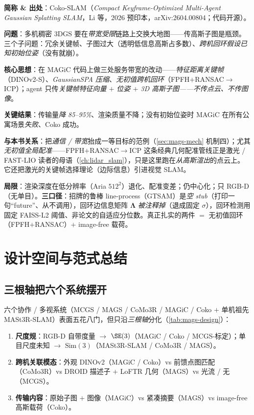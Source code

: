 \begin{paper}
\textbf{简称 \& 出处}：Coko-SLAM（\emph{Compact Keyframe-Optimized Multi-Agent Gaussian Splatting SLAM}，Li 等，2026 预印本，arXiv:2604.00804；代码开源）\cite{li2026kokoslam}。

\textbf{问题}：多机稠密 3DGS 要在\emph{带宽受限}链路上交换大地图——传高斯子图是瓶颈。三个子问题：冗余关键帧、子图过大（透明低信息高斯占多数）、\emph{跨机回环假设已知初始位姿}（没有就崩）。

\textbf{核心思想}：在 MAGiC 代码上做三处服务带宽的改动——\emph{特征距离关键帧}（DINOv2-S）、\emph{GaussianSPA 压缩}、\emph{无初值跨机回环}（FPFH$+$RANSAC$\to$ICP）；agent 只传\emph{关键帧特征向量 $+$ 位姿 $+$ 3D 高斯子图——不传点云、不传图像}。

\textbf{关键结果}：传输量\emph{降 85–95\%}、渲染质量不降；没有初始位姿时 MAGiC 在所有公寓场景\emph{失败}、Coko 成功。

\textbf{与本书关系}：把\emph{通信 / 带宽}抬成一等目标的范例（\cref{sec:mags-mech} 机制四）；尤其\emph{无初值全局配准}——FPFH$+$RANSAC$\to$ICP 这条经典几何配准管线正是激光 / FAST-LIO 读者的母语（\cref{ch:lidar_slam}），只是这里跑在\emph{从高斯渲出}的点云上。它还把激光的关键帧选择理论（边际信息）引进视觉 SLAM。

\textbf{局限}：渲染深度在低分辨率（Aria $512^2$）退化、配准变差；仍中心化；只 RGB-D（无单目）。\textbf{三口径}：招牌的鲁棒 line-process（GTSAM）是\emph{空 stub}（打印一句“future”、从不调用），回环边信息矩阵 $\boldsymbol\Lambda$ \emph{被注释掉}（退成固定 $\sigma$），回环检测用固定 FAISS-L2 阈值、非论文的自适应分位数。真正扎实的两件 $=$ 无初值回环（FPFH$+$RANSAC）$+$ image-free 载荷。
\end{paper}

\section{设计空间与范式总结}
\label{sec:mags-designspace}

\subsection{三根轴把六个系统摆开}

六个协作 / 多视系统（MCGS / MAGS / CoMo3R / MAGiC / Coko $+$ 单机祖先 MASt3R-SLAM）表面五花八门，但只沿\emph{三根轴}分化（\cref{tab:mags-design}）：
\begin{enumerate}
  \item \textbf{尺度规}：RGB-D 自带度量 $\to$ $\SE(3)$（MAGiC / Coko / MCGS-标定）；单目尺度未知 $\to$ $\mathrm{Sim}(3)$（MASt3R-SLAM / CoMo3R / MAGS）。
  \item \textbf{跨机关联模态}：外观 DINOv2（MAGiC / Coko）vs 前馈点图匹配（CoMo3R）vs DROID 描述子 $+$ LoFTR 几何（MAGS）vs 光流 / 无（MCGS）。
  \item \textbf{传输内容}：原始子图 $+$ 图像（MAGiC）vs 紧凑摘要（MAGS）vs image-free 高斯载荷（Coko）。
\end{enumerate}

